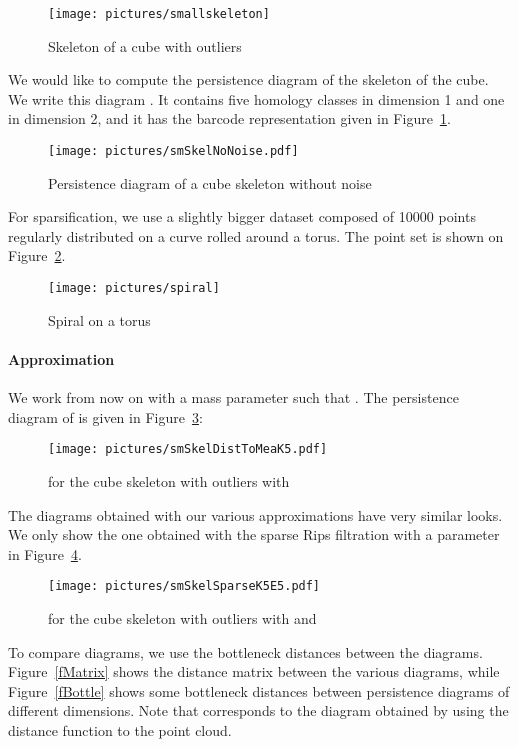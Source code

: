 \documentclass[a4paper]{article}
\begin{document}
\begin{figure}[!ht]
\centering
\texttt{[image: pictures/smallskeleton]}
\caption{Skeleton of a cube with outliers}
\end{figure}

We would like to compute the persistence diagram of the skeleton of the cube. 
We write this diagram .
It contains five homology classes in dimension 1 and one in dimension 2, and it has the barcode representation given in Figure~\ref{fDgmSkel}.

\begin{figure}[!ht]
\centering
\texttt{[image: pictures/smSkelNoNoise.pdf]}
\caption{Persistence diagram of a cube skeleton without noise}\label{fDgmSkel}
\end{figure}

For sparsification, we use a slightly bigger dataset composed of 10000 points regularly distributed on a curve rolled around a torus.
The point set is shown on Figure~\ref{fSpiral}.

\begin{figure}[!ht]
\centering
\texttt{[image: pictures/spiral]}
\caption{Spiral on a torus}\label{fSpiral}
\end{figure}

\paragraph{Approximation}

We work from now on with a mass parameter  such that . 
The persistence diagram of  is given in Figure~\ref{fPersDmP}:

\begin{figure}[!ht]
\centering
\texttt{[image: pictures/smSkelDistToMeaK5.pdf]}
\caption{ for the cube skeleton with outliers with }\label{fPersDmP}
\end{figure}

The diagrams obtained with our various approximations have very similar looks.
We only show the one obtained with the sparse Rips filtration with a parameter  in Figure~\ref{fPersSpars}.

\begin{figure}[!ht]
\centering
\texttt{[image: pictures/smSkelSparseK5E5.pdf]}
\caption{ for the cube skeleton with outliers with  and }\label{fPersSpars}
\end{figure}

To compare diagrams, we use the bottleneck distances between the diagrams.
Figure~\ref{fMatrix} shows the distance matrix between the various diagrams, while Figure~\ref{fBottle} shows some bottleneck distances between persistence diagrams of different dimensions.
Note that  corresponds to the diagram obtained by using the distance function to the point cloud.
\end{document}
